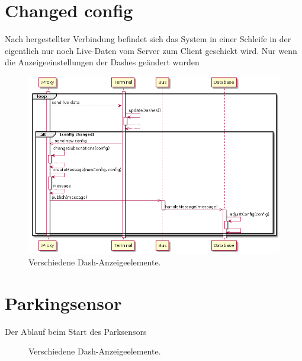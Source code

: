 \documentclass[entwurf.tex]{subfiles}
\begin{document}
  	\section{Changed config}
  		Nach hergestellter Verbindung befindet sich das System in einer Schleife in der eigentlich nur noch Live-Daten vom Server zum Client geschickt wird. Nur wenn die Anzeigeeinstellungen der Dashes geändert wurden 
  		\begin{figure}[H]
  			\begin{center}
 				\includegraphics[width=\textwidth]{diagrams/ChangeDashConfig.png}
  				\caption{Verschiedene Dash-Anzeigeelemente.}
  			\end{center}
  		\end{figure}
  		
  	\newpage
	\section{Parkingsensor}
		Der Ablauf beim Start des Parksensors
		\begin{figure}[H]
  			\begin{center}
  				\caption{Verschiedene Dash-Anzeigeelemente.}
  			\end{center}
  		\end{figure}
\end{document}
